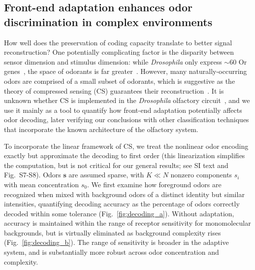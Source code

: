 \documentclass[10pt,prl,aps,showpacs,twocolumn,unsortedaddress]{revtex4-1}
\begin{document}
\subsection*{Front-end adaptation enhances odor discrimination in complex environments}

How well does the preservation of coding capacity translate to better signal reconstruction?
One potentially complicating factor is the disparity between sensor dimension and stimulus dimension: while \textit{Drosophila} only express $\sim 60$ Or genes~\cite{olfactory_sensory_map}, the space of odorants is far greater~\cite{vijay_1}. However, many naturally-occurring odors are comprised of a small subset of odorants, which is suggestive as the theory of compressed sensing (CS) guarantees their reconstruction~\cite{CS_donoho, CS_tao}. It is unknown whether CS is implemented in the \textit{Drosophila} olfactory circuit~\cite{chlovskii_pevlavan}, and we use it mainly as a tool to quantify how front-end adaptation potentially affects odor decoding, later verifying our conclusions with other classification techniques that incorporate the known architecture of the olfactory system. 

To incorporate the linear framework of CS, we treat the nonlinear odor encoding exactly but approximate the decoding to first order (this  linearization simplifies the computation, but is not critical for our general results; see SI text and Fig.~S7-S8). Odors $\mathbf s$ are assumed sparse, with $K \ll N$ nonzero components $s_i$ with mean concentration  $s_0$. We first examine how foreground odors are recognized when mixed with background odors of a distinct identity but similar intensities, quantifying decoding accuracy as the percentage of odors correctly decoded within some tolerance (Fig.~\ref{fig:decoding_a}). Without adaptation, accuracy is maintained within the range of receptor sensitivity for monomolecular backgrounds, but is virtually eliminated as background complexity rises (Fig.~\ref{fig:decoding_b}). The range of sensitivity is broader in the adaptive system, and is substantially more robust across odor concentration and complexity. 
\end{document}
